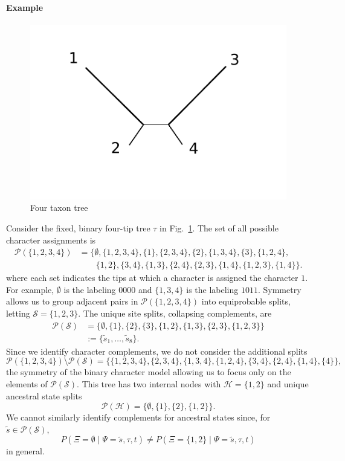 \documentclass[a4paper]{article}
\newcommand{\siteSplit}{\tilde{s}}
\newcommand{\siteSplitSet}{\mathcal{S}}
\newcommand{\ancestralSplitSet}{\mathcal{H}}
\newcommand{\siteSplitRV}{\Psi}
\newcommand{\ancestralSplitRV}{\Xi}
\begin{document}
\paragraph{Example}
\begin{figure}
    \centering
    \includegraphics[width=.45\textwidth]{unrooted_four_taxa}
    \caption{Four taxon tree}
\label{fig:four-taxa-tree}
\end{figure}

Consider the fixed, binary four-tip tree $\tau$ in Fig.~\ref{fig:four-taxa-tree}.
The set of all possible character assignments is
\begin{align*}
\mathcal{P}(\{1,2,3,4\}) &= \{\emptyset, \{1,2,3,4\}, \{1\}, \{2,3,4\}, \{2\}, \{1,3,4\}, \{3\}, \{1,2,4\}, \\
                         &\qquad \{1,2\}, \{3,4\}, \{1,3\}, \{2,4\}, \{2,3\}, \{1,4\}, \{1,2,3\}, \{1,4\}\}.
\end{align*}
where each set indicates the tips at which a character is assigned the character $1$.
For example, $\emptyset$ is the labeling $0000$ and $\{1,3,4\}$ is the labeling $1011$.
Symmetry allows us to group adjacent pairs in $\mathcal{P}(\{1,2,3,4\})$ into equiprobable splits, letting $\siteSplitSet=\{1,2,3\}$.
The unique site splits, collapsing complements, are
\begin{align*}
    \mathcal{P}(\siteSplitSet) &= \{\emptyset, \{1\}, \{2\}, \{3\}, \{1,2\}, \{1,3\}, \{2,3\}, \{1,2,3\}\} \\
& := \{\siteSplit_1, \ldots, \siteSplit_8\}.
\end{align*}
Since we identify character complements, we do not consider the additional splits
$$
\mathcal{P}(\{1,2,3,4\}) \setminus \mathcal{P}(\siteSplitSet) = \{\{1,2,3,4\}, \{2,3,4\}, \{1,3,4\}, \{1,2,4\}, \{3,4\}, \{2,4\}, \{1,4\}, \{4\}\},
$$
the symmetry of the binary character model allowing us to focus only on the elements of $\mathcal{P}(\siteSplitSet)$.
This tree has two internal nodes with $\ancestralSplitSet=\{1,2\}$ and unique ancestral state splits
$$
\mathcal{P}(\ancestralSplitSet) = \{\emptyset, \{1\}, \{2\}, \{1,2\}\}.
$$
We cannot similarly identify complements for ancestral states since, for $\siteSplit\in\mathcal{P}(\siteSplitSet)$,
$$
P(\ancestralSplitRV=\emptyset \mid \siteSplitRV=\siteSplit, \tau, t)\neq P(\ancestralSplitRV=\{1,2\} \mid \siteSplitRV=\siteSplit, \tau, t)
$$
in general.
\end{document}
